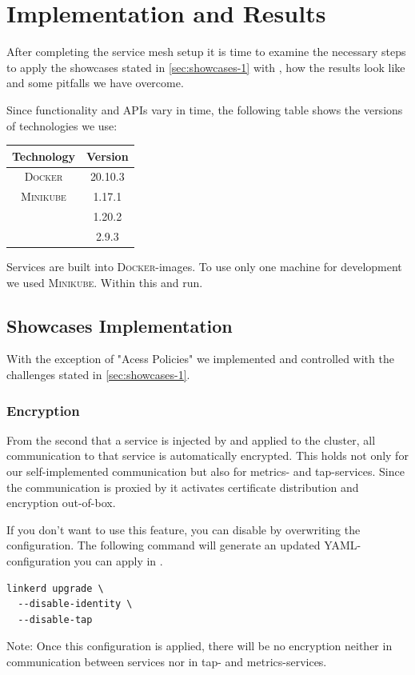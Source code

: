 \section{Implementation and Results}

After completing the service mesh setup it is time to examine the necessary steps to apply the showcases stated in \autoref{sec:showcases-1} with \linkerd{}, how the results look like and some pitfalls we have overcome.

Since functionality and APIs vary in time, the following table shows the versions of technologies we use:
\begin{table}[h]
\centering	
\begin{tabular}{c|c}
	Technology & Version \\\hline
	\textsc{Docker} & 20.10.3\\\hline
	\textsc{Minikube} & 1.17.1\\\hline
	\kubernetes & 1.20.2\\\hline
	\linkerd & 2.9.3 \\
\end{tabular}
\vspace{0.25mm}
\label{tab:versions}
\end{table}

Services are built into \textsc{Docker}-images.
To use only one machine for development we used \textsc{Minikube}.
Within this \kubernetes{} and \linkerd{} run.

\subsection{Showcases Implementation}
With the exception of "Acess Policies" we implemented and controlled with \linkerd{} the challenges stated in \autoref{sec:showcases-1}.

\subsubsection{Encryption}
From the second that a service is injected by \linkerd{} and applied to the cluster, all communication to that service is automatically encrypted.
This holds not only for our self-implemented communication but also for metrics- and tap-services.
Since the communication is proxied by \linkerd{} it activates certificate distribution and encryption out-of-box.

If you don't want to use this feature, you can disable by overwriting the \linkerd{} configuration.
The following command will generate an updated YAML-configuration you can apply in \kubernetes{}.
\begin{lstlisting}
linkerd upgrade \
  --disable-identity \
  --disable-tap
\end{lstlisting}
Note: Once this configuration is applied, there will be no encryption neither in communication between services nor in tap- and metrics-services.

